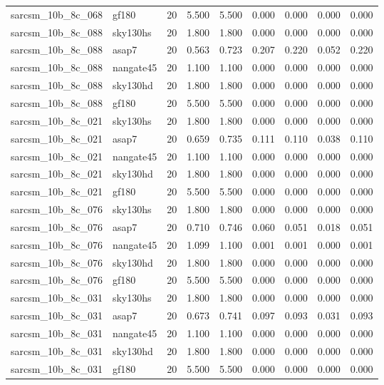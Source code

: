 \begin{tabular}{llrrrrrrr}
sarcsm\_10b\_8c\_068 & gf180 & 20 & 5.500 & 5.500 & 0.000 & 0.000 & 0.000 & 0.000 \\
sarcsm\_10b\_8c\_088 & sky130hs & 20 & 1.800 & 1.800 & 0.000 & 0.000 & 0.000 & 0.000 \\
sarcsm\_10b\_8c\_088 & asap7 & 20 & 0.563 & 0.723 & 0.207 & 0.220 & 0.052 & 0.220 \\
sarcsm\_10b\_8c\_088 & nangate45 & 20 & 1.100 & 1.100 & 0.000 & 0.000 & 0.000 & 0.000 \\
sarcsm\_10b\_8c\_088 & sky130hd & 20 & 1.800 & 1.800 & 0.000 & 0.000 & 0.000 & 0.000 \\
sarcsm\_10b\_8c\_088 & gf180 & 20 & 5.500 & 5.500 & 0.000 & 0.000 & 0.000 & 0.000 \\
sarcsm\_10b\_8c\_021 & sky130hs & 20 & 1.800 & 1.800 & 0.000 & 0.000 & 0.000 & 0.000 \\
sarcsm\_10b\_8c\_021 & asap7 & 20 & 0.659 & 0.735 & 0.111 & 0.110 & 0.038 & 0.110 \\
sarcsm\_10b\_8c\_021 & nangate45 & 20 & 1.100 & 1.100 & 0.000 & 0.000 & 0.000 & 0.000 \\
sarcsm\_10b\_8c\_021 & sky130hd & 20 & 1.800 & 1.800 & 0.000 & 0.000 & 0.000 & 0.000 \\
sarcsm\_10b\_8c\_021 & gf180 & 20 & 5.500 & 5.500 & 0.000 & 0.000 & 0.000 & 0.000 \\
sarcsm\_10b\_8c\_076 & sky130hs & 20 & 1.800 & 1.800 & 0.000 & 0.000 & 0.000 & 0.000 \\
sarcsm\_10b\_8c\_076 & asap7 & 20 & 0.710 & 0.746 & 0.060 & 0.051 & 0.018 & 0.051 \\
sarcsm\_10b\_8c\_076 & nangate45 & 20 & 1.099 & 1.100 & 0.001 & 0.001 & 0.000 & 0.001 \\
sarcsm\_10b\_8c\_076 & sky130hd & 20 & 1.800 & 1.800 & 0.000 & 0.000 & 0.000 & 0.000 \\
sarcsm\_10b\_8c\_076 & gf180 & 20 & 5.500 & 5.500 & 0.000 & 0.000 & 0.000 & 0.000 \\
sarcsm\_10b\_8c\_031 & sky130hs & 20 & 1.800 & 1.800 & 0.000 & 0.000 & 0.000 & 0.000 \\
sarcsm\_10b\_8c\_031 & asap7 & 20 & 0.673 & 0.741 & 0.097 & 0.093 & 0.031 & 0.093 \\
sarcsm\_10b\_8c\_031 & nangate45 & 20 & 1.100 & 1.100 & 0.000 & 0.000 & 0.000 & 0.000 \\
sarcsm\_10b\_8c\_031 & sky130hd & 20 & 1.800 & 1.800 & 0.000 & 0.000 & 0.000 & 0.000 \\
sarcsm\_10b\_8c\_031 & gf180 & 20 & 5.500 & 5.500 & 0.000 & 0.000 & 0.000 & 0.000 \\

\end{tabular}
